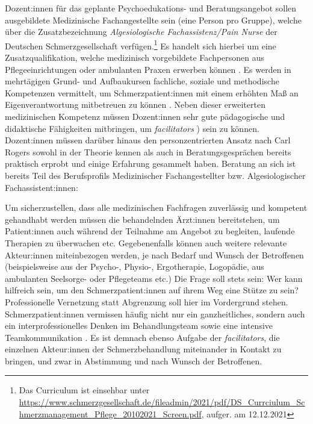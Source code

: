 \documentclass[
  twoside,
  parskip=half-,
  paper=176mm:246mm,
  BCOR=14mm,
  DIV=14,
]{scrreprt}
\begin{document}
\begin{praxis}
  Dozent:innen für das geplante Psychoedukations- und Beratungsangebot sollen ausgebildete Medizinische Fachangestellte sein (eine Person pro Gruppe), welche über die Zusatzbezeichnung \textit{Algesiologische Fachassistenz/Pain Nurse} der Deutschen Schmerzgesellschaft verfügen.\footnote{Das Curriculum ist einsehbar unter \url{https://www.schmerzgesellschaft.de/fileadmin/2021/pdf/DS_Currciulum_Schmerzmanagement_Pflege_20102021_Screen.pdf}, aufger. am 12.12.2021} Es handelt sich hierbei um eine Zusatzqualifikation, welche medizinisch vorgebildete Fachpersonen aus Pflegeeinrichtungen oder ambulanten Praxen erwerben können \autocite[vgl.][193]{nobisHerausforderung}. Es werden in mehrtägigen Grund- und Aufbaukursen fachliche, soziale und methodische Kompetenzen vermittelt, um Schmerzpatient:innen mit einem erhöhten Maß an Eigenverantwortung mitbetreuen zu können \autocite[vgl.][193]{nobisHerausforderung}. Neben dieser erweiterten medizinischen Kompetenz müssen Dozent:innen sehr gute pädagogische und didaktische Fähigkeiten mitbringen, um \textit{facilitators} \autocite[110]{rogersLernenFreiheit}) sein zu können. Dozent:innen müssen darüber hinaus den personzentrierten Ansatz nach Carl Rogers sowohl in der Theorie kennen als auch in Beratungsgesprächen bereits praktisch erprobt und einige Erfahrung gesammelt haben. Beratung an sich ist bereits Teil des Berufsprofils Medizinischer Fachangestellter bzw. Algesiologischer Fachassistent:innen: 

  Um sicherzustellen, dass alle medizinischen Fachfragen zuverlässig und kompetent gehandhabt werden müssen die behandelnden Ärzt:innen bereitstehen, um Patient:innen auch während der Teilnahme am Angebot zu begleiten, laufende Therapien zu überwachen etc.  Gegebenenfalls können auch weitere relevante Akteur:innen miteinbezogen werden, je nach Bedarf und Wunsch der Betroffenen (beispielsweise aus der Psycho-, Physio-, Ergotherapie, Logopädie, aus ambulanten Seelsorge- oder Pflegeteams etc.) Die Frage soll stets sein: Wer kann hilfreich sein, um den Schmerzpatient:innen auf ihrem Weg eine Stütze zu sein? Professionelle Vernetzung statt Abgrenzung soll hier im Vordergrund stehen. Schmerzpatient:innen vermissen häufig nicht nur ein ganzheitliches, sondern auch ein interprofessionelles Denken im Behandlungsteam sowie eine intensive Teamkommunikation \autocite[vgl.][338]{HeftSchmerz5}. Es ist demnach ebenso Aufgabe der \textit{facilitators}, die einzelnen Akteur:innen der Schmerzbehandlung miteinander in Kontakt zu bringen, und zwar in Abstimmung und nach Wunsch der Betroffenen.
\end{praxis}
\end{document}
